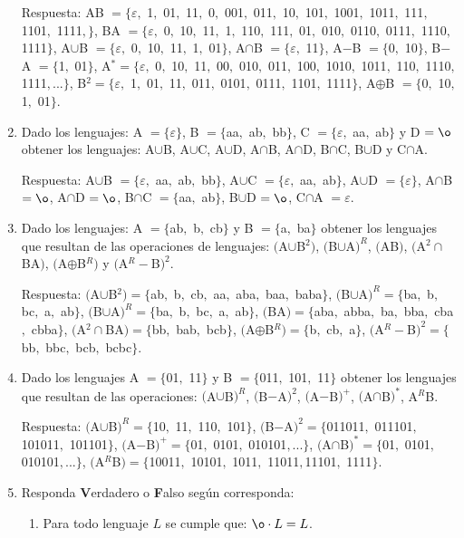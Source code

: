 \documentclass{article}
\begin{document}
\begin{enumerate}
		Respuesta: AB $= \{\varepsilon,$ 1$,$ 01$,$ 11$,$ 0$,$ 001$,
		$ 011$,$ 10$,$ 101$,$ 1001$,$ 1011$,$ 111$,$ 1101$,$ 1111$,\}$,
		BA $= \{\varepsilon,$ 0$,$ 10$,$ 11$,$ 1$,$ 110$,
		$ 111$,$ 01$,$ 010$,$ 0110$,$ 0111$,$ 1110$,$ 1111$\}$,
		A$\cup$B $= \{\varepsilon,$ 0$,$ 10$,$ 11$,$ 1$,$ 01$\}$,
		A$\cap$B $= \{\varepsilon,$ 11$\}$,
		A$-$B $= \{$0$,$ 10$\}$,
		B$-$A $= \{$1$,$ 01$\}$,
		A$^* = \{\varepsilon,$ 0$,$ 10$,$ 11$,$ 00$,$ 010$,$ 011$,
		$ 100$,$ 1010$,$ 1011$,$ 110$,$ 1110$,$ 1111$, ...\}$,
		B$^2 = \{\varepsilon,$ 1$,$ 01$,$ 11$,$ 011$,$ 0101$,$ 0111$,
		$ 1101$,$ 1111$\}$,
		A$\oplus$B $= \{$0$,$ 10$,$ 1$,$ 01$\}$.
	\item Dado los lenguajes: A $= \{\varepsilon\}$, B $=
		\{$aa$,$ ab$,$ bb$\}$, C $= \{\varepsilon,$ aa$,$ ab$\}$ y
		D $= \o$ obtener los lenguajes:
		A$\cup$B, A$\cup$C, A$\cup$D, A$\cap$B, A$\cap$D, B$\cap$C,
		B$\cup$D y C$\cap$A.

		Respuesta: A$\cup$B $= \{\varepsilon, $ aa$,$ ab$,$ bb$\}$,
		A$\cup$C $= \{\varepsilon, $ aa$,$ ab$\}$,
		A$\cup$D $= \{\varepsilon\}$,
		A$\cap$B $= \o$,
		A$\cap$D $= \o$,
		B$\cap$C $= \{$aa$,$ ab$\}$,
		B$\cup$D $= \o$,
		C$\cap$A $= \varepsilon$.
	\item Dado los lenguajes: A $= \{$ab$,$ b$, $ cb$\}$ y B $=
		\{$a$,$ ba$\}$ obtener los
		lenguajes que resultan de las operaciones de lenguajes:
		$($A$\cup$B$^2)$, $($B$\cup$A$)^R$, $($AB$)$, $($A$^2\cap$BA$)$,
		$($A$\oplus$B$^R)$ y $($A$^R-$B$)^2$.

		Respuesta: $($A$\cup$B$^2) = \{$ab$,$ b$,$ cb$,$ aa$,$ aba$,
		$ baa$,$ baba$\}$,
		$($B$\cup$A$)^R = \{$ba$,$ b$,$ bc$,$ a$,$ ab$\}$,
		$($B$\cup$A$)^R = \{$ba$,$ b$,$ bc$,$ a$,$ ab$\}$,
		$($BA$) = \{$aba$,$ abba$,$ ba$,$ bba$,$ cba$,$ cbba$\}$,
		$($A$^2\cap$BA$) = \{$bb$,$ bab$,$ bcb$\}$,
		$($A$\oplus$B$^R) = \{$b$,$ cb$,$ a$\}$,
		$($A$^R-$B$)^2 = \{$bb$,$ bbc$,$ bcb$,$ bcbc$\}$.
	\item Dado los lenguajes A $= \{$01$,$ 11$\}$ y B $= \{$011$,$ 101$,$ 11$\}$
		obtener los lenguajes que resultan de las operaciones:
		$($A$\cup$B$)^R$, $($B$-$A$)^2$, $($A$-$B$)^+$, $($A$\cap$B$)^*$,
		A$^R$B.

		Respuesta: $($A$\cup$B$)^R = \{$10$,$ 11$,$ 110$,$ 101$\}$,
		$($B$-$A$)^2 = \{$011011$,$ 011101$,$ 101011$,$ 101101$\}$,
		$($A$-$B$)^+ = \{$01$,$ 0101$,$ 010101$, ...\}$,
		$($A$\cap$B$)^* = \{$01$,$ 0101$,$ 010101$, ...\}$,
		$($A$^R$B$) = \{$10011$,$ 10101$,$ 1011$,$ 11011$,$11101$,$ 1111$\}$.
	\item Responda \textbf{V}erdadero o \textbf{F}also según corresponda:
		\begin{enumerate}
			\item Para todo lenguaje $L$ se cumple que: $\o \cdot
				L = L$.


\end{enumerate}
\end{enumerate}
\end{document}
